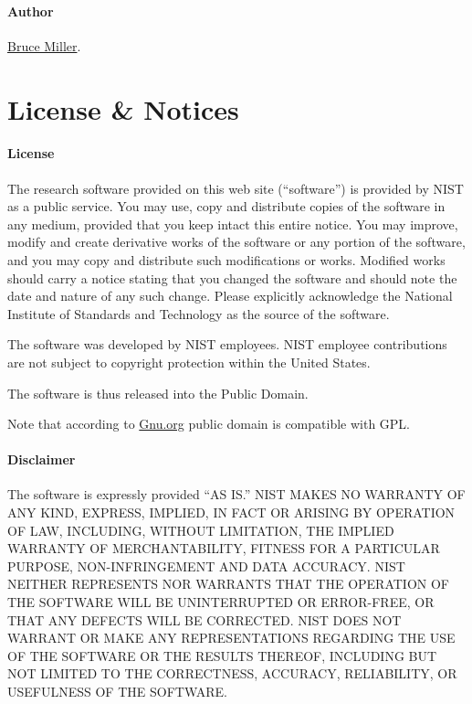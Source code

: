 \documentclass{article}
\begin{document}

\paragraph{Author} \href{mailto:bruce.miller@nist.gov}{Bruce Miller}.
\section{License \& Notices}\label{notices}

\paragraph{License}
The research software provided on this web site (``software'') is
provided by NIST as a public service. You may use, copy and distribute
copies of the software in any medium, provided that you keep intact
this entire notice. You may improve, modify and create derivative
works of the software or any portion of the software, and you may copy
and distribute such modifications or works. Modified works should
carry a notice stating that you changed the software and should note
the date and nature of any such change. Please explicitly acknowledge
the National Institute of Standards and Technology as the source of
the software.

The software was developed by NIST employees. NIST employee
contributions are not subject to copyright protection within the
United States.

The software is thus released into the Public Domain.

Note that according to
\href{http://www.gnu.org/licences/license-list.html#PublicDomain}{Gnu.org}
public domain is compatible with GPL.

\paragraph{Disclaimer}
The software is expressly provided ``AS IS.'' NIST MAKES NO WARRANTY OF
ANY KIND, EXPRESS, IMPLIED, IN FACT OR ARISING BY OPERATION OF LAW,
INCLUDING, WITHOUT LIMITATION, THE IMPLIED WARRANTY OF
MERCHANTABILITY, FITNESS FOR A PARTICULAR PURPOSE, NON-INFRINGEMENT
AND DATA ACCURACY. NIST NEITHER REPRESENTS NOR WARRANTS THAT THE
OPERATION OF THE SOFTWARE WILL BE UNINTERRUPTED OR ERROR-FREE, OR THAT
ANY DEFECTS WILL BE CORRECTED. NIST DOES NOT WARRANT OR MAKE ANY
REPRESENTATIONS REGARDING THE USE OF THE SOFTWARE OR THE RESULTS
THEREOF, INCLUDING BUT NOT LIMITED TO THE CORRECTNESS, ACCURACY,
RELIABILITY, OR USEFULNESS OF THE SOFTWARE.
\end{document}
